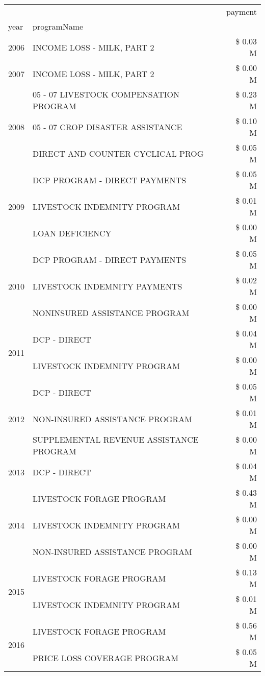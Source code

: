\begin{tabular}{llr}
\toprule
 &  & payment \\
year & programName &  \\
\midrule
2006 & INCOME LOSS - MILK, PART 2 & \$ 0.03 M \\
\cline{1-3}
2007 & INCOME LOSS - MILK, PART 2 & \$ 0.00 M \\
\cline{1-3}
\multirow[t]{3}{*}{2008} & 05 - 07 LIVESTOCK COMPENSATION PROGRAM & \$ 0.23 M \\
 & 05 - 07 CROP DISASTER ASSISTANCE & \$ 0.10 M \\
 & DIRECT AND COUNTER CYCLICAL PROG & \$ 0.05 M \\
\cline{1-3}
\multirow[t]{3}{*}{2009} & DCP PROGRAM - DIRECT PAYMENTS & \$ 0.05 M \\
 & LIVESTOCK INDEMNITY PROGRAM & \$ 0.01 M \\
 & LOAN DEFICIENCY & \$ 0.00 M \\
\cline{1-3}
\multirow[t]{3}{*}{2010} & DCP PROGRAM - DIRECT PAYMENTS & \$ 0.05 M \\
 & LIVESTOCK INDEMNITY PAYMENTS & \$ 0.02 M \\
 & NONINSURED ASSISTANCE PROGRAM & \$ 0.00 M \\
\cline{1-3}
\multirow[t]{2}{*}{2011} & DCP - DIRECT & \$ 0.04 M \\
 & LIVESTOCK INDEMNITY PROGRAM & \$ 0.00 M \\
\cline{1-3}
\multirow[t]{3}{*}{2012} & DCP - DIRECT & \$ 0.05 M \\
 & NON-INSURED ASSISTANCE PROGRAM & \$ 0.01 M \\
 & SUPPLEMENTAL REVENUE ASSISTANCE PROGRAM & \$ 0.00 M \\
\cline{1-3}
2013 & DCP - DIRECT & \$ 0.04 M \\
\cline{1-3}
\multirow[t]{3}{*}{2014} & LIVESTOCK FORAGE PROGRAM & \$ 0.43 M \\
 & LIVESTOCK INDEMNITY PROGRAM & \$ 0.00 M \\
 & NON-INSURED ASSISTANCE PROGRAM & \$ 0.00 M \\
\cline{1-3}
\multirow[t]{2}{*}{2015} & LIVESTOCK FORAGE PROGRAM & \$ 0.13 M \\
 & LIVESTOCK INDEMNITY PROGRAM & \$ 0.01 M \\
\cline{1-3}
\multirow[t]{3}{*}{2016} & LIVESTOCK FORAGE PROGRAM                      & \$ 0.56 M \\
 & PRICE LOSS COVERAGE PROGRAM                   & \$ 0.05 M \\

\end{tabular}

